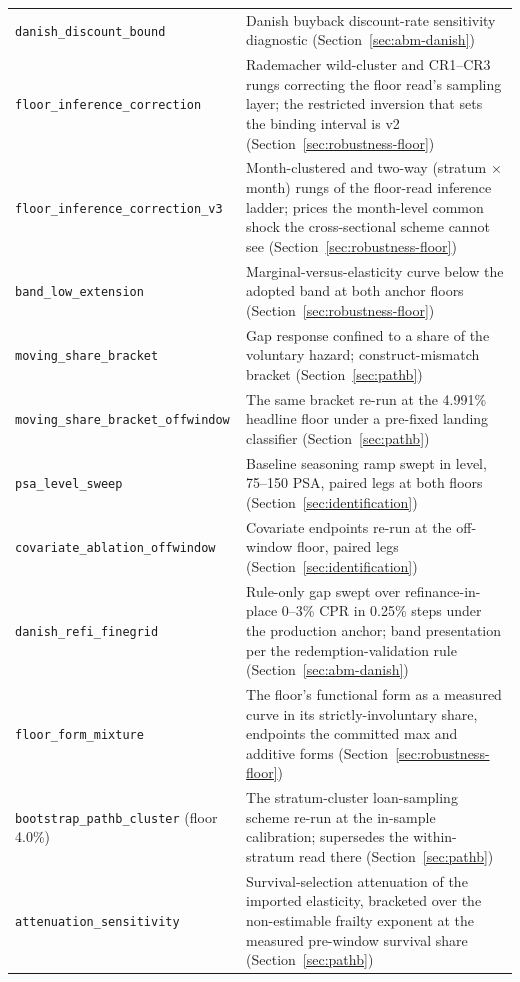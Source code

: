 \documentclass[12pt]{article}
\begin{document}
{\begin{longtable}{@{}p{5.4cm}p{8.8cm}@{}}
\texttt{danish\_discount\_bound} & Danish buyback discount-rate sensitivity diagnostic (Section~\ref{sec:abm-danish}) \\
\texttt{floor\_inference\_correction} & Rademacher wild-cluster and CR1--CR3 rungs correcting the floor read's sampling layer; the restricted inversion that sets the binding interval is v2 (Section~\ref{sec:robustness-floor}) \\
\texttt{floor\_inference\_correction\_v3} & Month-clustered and two-way (stratum $\times$ month) rungs of the floor-read inference ladder; prices the month-level common shock the cross-sectional scheme cannot see (Section~\ref{sec:robustness-floor}) \\
\texttt{band\_low\_extension} & Marginal-versus-elasticity curve below the adopted band at both anchor floors (Section~\ref{sec:robustness-floor}) \\
\texttt{moving\_share\_bracket} & Gap response confined to a share of the voluntary hazard; construct-mismatch bracket (Section~\ref{sec:pathb}) \\ \texttt{moving\_share\_bracket\_offwindow} & The same bracket re-run at the 4.991\% headline floor under a pre-fixed landing classifier (Section~\ref{sec:pathb}) \\ \texttt{psa\_level\_sweep} & Baseline seasoning ramp swept in level, 75--150 PSA, paired legs at both floors (Section~\ref{sec:identification}) \\ \texttt{covariate\_ablation\_offwindow} & Covariate endpoints re-run at the off-window floor, paired legs (Section~\ref{sec:identification}) \\ \texttt{danish\_refi\_finegrid} & Rule-only gap swept over refinance-in-place 0--3\% CPR in 0.25\% steps under the production anchor; band presentation per the redemption-validation rule (Section~\ref{sec:abm-danish}) \\ \texttt{floor\_form\_mixture} & The floor's functional form as a measured curve in its strictly-involuntary share, endpoints the committed max and additive forms (Section~\ref{sec:robustness-floor}) \\ \texttt{bootstrap\_pathb\_cluster} (floor 4.0\%) & The stratum-cluster loan-sampling scheme re-run at the in-sample calibration; supersedes the within-stratum read there (Section~\ref{sec:pathb}) \\ \texttt{attenuation\_sensitivity} & Survival-selection attenuation of the imported elasticity, bracketed over the non-estimable frailty exponent at the measured pre-window survival share (Section~\ref{sec:pathb}) \\

\end{longtable}}
\end{document}
